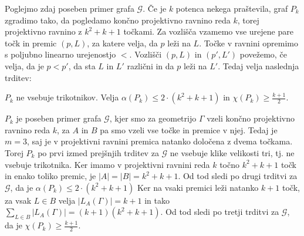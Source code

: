 \documentclass[mat1, tisk]{fmfdelo}
\begin{document}
Poglejmo zdaj poseben primer grafa $\mathcal{G}$. Če je $k$ potenca nekega praštevila, graf $P_k$ zgradimo tako, da pogledamo končno projektivno ravnino reda $k$, torej projektivno ravnino z $k^2 + k + 1$ točkami. Za vozlišča vzamemo vse urejene pare točk in premic $(p, L)$, za katere velja,
da $p$ leži na $L$. Točke v ravnini opremimo s poljubno linearno urejenostjo $<$. Vozlišči $(p, L)$ in $(p', L')$ povežemo, če velja, da je $p < p'$, da sta $L$ in $L'$ različni in da $p$ leži na $L'$. 
Tedaj velja naslednja trditev:

    \begin{trditev}
        $P_k$ ne vsebuje trikotnikov. Velja $\alpha(P_k) \leq 2 \cdot (k^2 + k + 1)$ in $\chi(P_k) \geq \frac{k + 1}{2}$.
    \end{trditev}

    \begin{dokaz}
        $P_k$ je poseben primer grafa $\mathcal{G}$, kjer smo za geometrijo $\Gamma$ vzeli končno projektivno ravnino reda $k$, za $A$ in $B$ pa smo vzeli vse točke in premice v njej. Tedaj je $m = 3$, saj je v projektivni
        ravnini premica natanko določena z dvema točkama. Torej $P_k$ po prvi izmed prejšnjih trditev za $\mathcal{G}$ ne vsebuje klike velikosti tri, tj. ne vsebuje trikotnika. Ker imamo v projektivni ravnini reda 
        $k$ točno $k^2 + k + 1$ točk in enako toliko premic, je $|A| = |B| = k^2 + k + 1$. Od tod sledi po drugi trditvi za $\mathcal{G}$, da je $\alpha(P_k) \leq 2 \cdot (k^2 + k + 1)$ Ker na vsaki premici leži natanko 
        $k + 1$ točk, za vsak $L \in B$ velja $|L_A(\Gamma)| = k + 1$ in tako $\sum_{L \in B}|L_A(\Gamma)| = (k + 1)(k^2 + k +1)$. Od tod sledi po tretji trditvi za $\mathcal{G}$, da je $\chi(P_k) \geq \frac{k + 1}{2}$.
    \end{dokaz}



    
\end{document}
